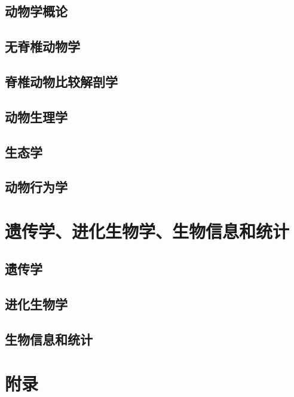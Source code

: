 \documentclass[b5paper,zihao=-4]{ctexbook}
\begin{document}
	\chapter{动物学概论}
		
	\chapter{无脊椎动物学}
		
	\chapter[脊椎比解]{脊椎动物比较解剖学}
		
	\chapter{动物生理学}
		
	\chapter{生态学}
		
	\chapter{动物行为学}
		

	\part{遗传学、进化生物学、生物信息和统计}
	\chapter{遗传学}
		
	\chapter{进化生物学}
		
	\chapter{生物信息和统计}
		



\part{附录}
\end{document}
